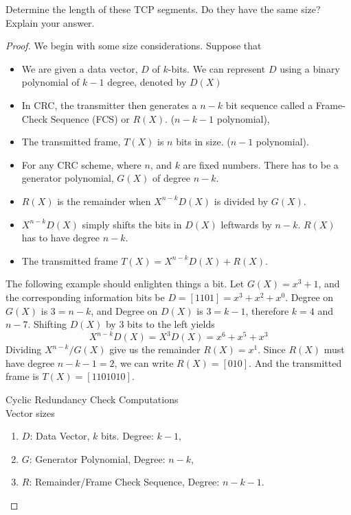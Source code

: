 \documentclass[../../main.tex]{subfiles}
\begin{document}
\begin{wts}
Determine the length of these TCP segments. Do they have the same size? Explain your answer.
\end{wts}
\begin{proof}
We begin with some size considerations. Suppose that
\begin{itemize}
    \item We are given a data vector, $D$ of $k$-bits. We can represent $D$ using a binary polynomial of $k-1$ degree, denoted by $D(X)$
    \item In CRC, the transmitter then generates a $n-k$ bit sequence called a Frame-Check Sequence (FCS) or $R(X)$. ($n-k-1$ polynomial),
    \item The transmitted frame, $T(X)$ is $n$ bits in size. ($n-1$ polynomial).
    \item For any CRC scheme, where $n$, and $k$ are fixed numbers. There has to be a generator polynomial, $G(X)$ of degree $n-k$.
    \item $R(X)$ is the remainder when $X^{n-k}D(X)$ is divided by $G(X)$.
    \item $X^{n-k}D(X)$ simply shifts the bits in $D(X)$ leftwards by $n-k$. $R(X)$ has to have degree $n-k$.
    \item The transmitted frame $T(X) = X^{n-k}D(X) + R(X)$.
\end{itemize}
The following example should enlighten things a bit. Let $G(X) = x^3 + 1$, and the corresponding information bits be $D = [1101]=x^3+x^2+x^0$. Degree on $G(X)$ is $3=n-k$, and Degree on $D(X)$ is $3=k-1$, therefore $k=4$ and $n-7$. Shifting $D(X)$ by $3$ bits to the left yields
\[
X^{n-k}D(X) = X^3D(X) = x^6 + x^5 + x^3
\]
Dividing $X^{n-k}/G(X)$ give us the remainder $R(X) = x^1$. Since $R(X)$ must have degree $n-k-1=2$, we can write $R(X) = [010]$. And the transmitted frame is $T(X) = [1101010]$.
\begin{wtr} Cyclic Redundancy Check Computations\\[2ex]
    Vector sizes
    \begin{enumerate}
        \item $D$: Data Vector, $k$ bits. Degree: $k-1$,
        \item $G$: Generator Polynomial, Degree: $n-k$,
        \item $R$: Remainder/Frame Check Sequence, Degree: $n-k-1$.
    \end{enumerate}

\end{wtr}
\end{proof}
\end{document}
